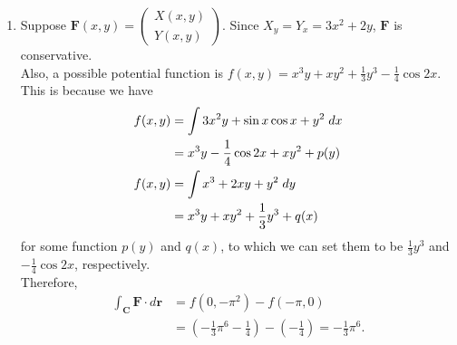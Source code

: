 \documentclass{article}
\begin{document}
\begin{enumerate}
    \item Suppose $\textbf{F}(x,y) = \begin{pmatrix} X(x,y) \\ Y(x,y) \end{pmatrix}$. Since $X_y = Y_x = 3x^2 + 2y$, $\textbf{F}$ is conservative.\\
    Also, a possible potential function is $f(x,y) = x^3y + xy^2 + \frac{1}{3}y^3 - \frac{1}{4}\cos{2x}$. This is because we have
    \begin{align*}
        f(x,y) &= \int 3x^2y + \sin{x}\cos{x} + y^2 \hspace{1mm}dx\\
        &= x^3y - \frac{1}{4}\cos{2x} + xy^2 + p(y)\\
        f(x,y) &= \int x^3 + 2xy + y^2 \hspace{1mm}dy\\
        &= x^3y + xy^2 + \frac{1}{3}y^3 + q(x)
    \end{align*}
    for some function $p(y)$ and $q(x)$, to which we can set them to be $\frac{1}{3}y^3$ and $- \frac{1}{4}\cos{2x}$, respectively.\\
    Therefore,
    \begin{align*}
        \int_\textbf{C} \textbf{F}\cdot d\textbf{r} &= f(0, -\pi^2) - f(-\pi, 0)\\
        &= \left(-\frac{1}{3}\pi^6 - \frac{1}{4}\right) - \left(-\frac{1}{4}\right) = -\frac{1}{3}\pi^6.
    \end{align*}
    

\end{enumerate}
\end{document}
